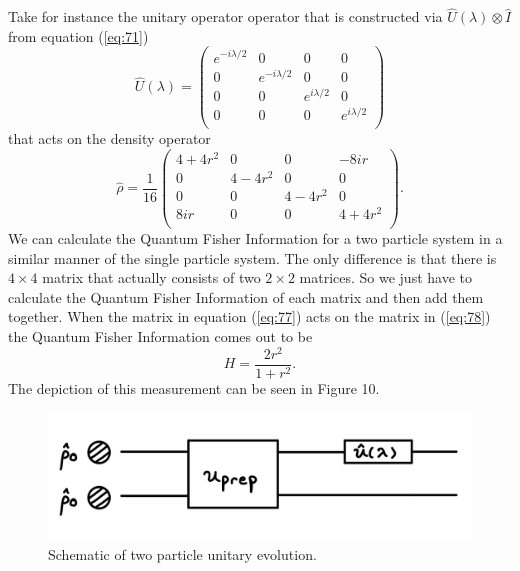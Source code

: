 \documentclass[twocolumn]{article}
\begin{document}
Take for instance the unitary operator operator that is constructed via $\hat{U}(\lambda)\otimes\hat{I}$ from equation (\ref{eq:71})
\begin{equation} \label{eq:77}
\hat{U}(\lambda)=
\left(\begin{array}{cccc}
e^{-i\lambda/2} & 0 & 0 & 0 \\
0 & e^{-i\lambda/2} & 0 & 0 \\
0 & 0 & e^{i\lambda/2} & 0 \\
0 & 0 & 0 & e^{i\lambda/2} \\
\end{array}\right)
\end{equation}
that acts on the density operator
\begin{equation} \label{eq:78}
\hat{\rho}=\frac{1}{16}
\left(\begin{array}{cccc}
4+4r^2 & 0 & 0 & -8ir \\
0 & 4-4r^2 & 0 & 0 \\
0 & 0 & 4-4r^2 & 0 \\
8ir & 0 & 0 & 4+4r^2 \\
\end{array}\right).
\end{equation}
We can calculate the Quantum Fisher Information for a two particle system in a similar manner of the single particle system. The only difference is that there is $4\times4$ matrix that actually consists of two $2\times2$ matrices. So we just have to calculate the Quantum Fisher Information of each matrix and then add them together. When the matrix in equation (\ref{eq:77}) acts on the matrix in (\ref{eq:78}) the Quantum Fisher Information comes out to be
\begin{equation} \label{eq:79}
H=\frac{2r^2}{1+r^2}.
\end{equation}
The depiction of this measurement can be seen in Figure 10.
\begin{figure}[htpb]
\begin{center}
\includegraphics[width=0.90\linewidth]{Two-Particle-One-Unitary-QFI.jpg}
\caption{Schematic of two particle unitary evolution.}
\end{center}
\end{figure}
\end{document}
